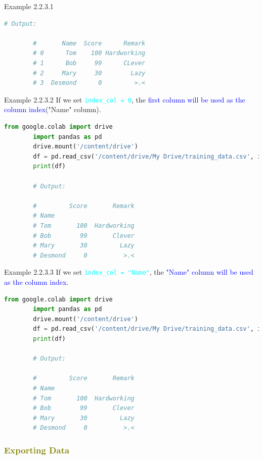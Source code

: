 \documentclass{book}
\begin{document}
\begin{description}
\begin{egBox}{Example 2.2.3.1}{}
\begin{lstlisting}[language=Python, basicstyle=\ttfamily\small, keywordstyle=\color{blue}, commentstyle=\color{forestgreen}, stringstyle=\color{red}, showstringspaces=false]
        # Output:

        #       Name  Score      Remark
        # 0      Tom    100 Hardworking
        # 1      Bob     99      CLever
        # 2     Mary     30        Lazy
        # 3  Desmond      0         >.<
        \end{lstlisting}
    \end{egBox}
    \newpage
    \begin{egBox}{Example 2.2.3.2}{}
        If we set \textcolor{cyan}{\texttt{index\_col = 0}}, the \textcolor{blue}{first column will be used as the column index}("Name" column).
        \begin{lstlisting}[language=Python, basicstyle=\ttfamily\small, keywordstyle=\color{blue}, commentstyle=\color{forestgreen}, stringstyle=\color{red}, showstringspaces=false]
        from google.colab import drive
        import pandas as pd
        drive.mount('/content/drive')
        df = pd.read_csv('/content/drive/My Drive/training_data.csv', index_col = 0)
        print(df)

        # Output:

        #         Score       Remark
        # Name
        # Tom       100  Hardworking
        # Bob        99       Clever
        # Mary       30         Lazy
        # Desmond     0          >.<
        \end{lstlisting}
    \end{egBox}
    \begin{egBox}{Example 2.2.3.3}{}
        If we set \textcolor{cyan}{\texttt{index\_col = "Name"}}, the \textcolor{blue}{"Name" column will be used as the column index}.
        \begin{lstlisting}[language=Python, basicstyle=\ttfamily\small, keywordstyle=\color{blue}, commentstyle=\color{forestgreen}, stringstyle=\color{red}, showstringspaces=false]
        from google.colab import drive
        import pandas as pd
        drive.mount('/content/drive')
        df = pd.read_csv('/content/drive/My Drive/training_data.csv', index_col = "Name")
        print(df)

        # Output:

        #         Score       Remark
        # Name
        # Tom       100  Hardworking
        # Bob        99       Clever
        # Mary       30         Lazy
        # Desmond     0          >.<
        \end{lstlisting}
    \end{egBox}
\end{description}
\textcolor{olive}{\subsubsection{Exporting Data}}
\end{document}
